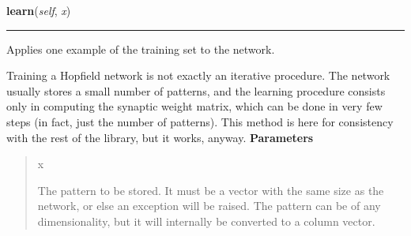 \hspace{.8\funcindent}\begin{boxedminipage}{\funcwidth}

    \raggedright \textbf{learn}(\textit{self}, \textit{x})

    \vspace{-1.5ex}

    \rule{\textwidth}{0.5\fboxrule}
\setlength{\parskip}{2ex}

Applies one example of the training set to the network.

Training a Hopfield network is not exactly an iterative procedure. The
network usually stores a small number of patterns, and the learning
procedure consists only in computing the synaptic weight matrix, which
can be done in very few steps (in fact, just the number of patterns).
This method is here for consistency with the rest of the library, but
it works, anyway.
\setlength{\parskip}{1ex}
      \textbf{Parameters}
      \vspace{-1ex}

      \begin{quote}
        \begin{Ventry}{x}

          \item[x]


The pattern to be stored. It must be a vector with the same size as
the network, or else an exception will be raised. The pattern can be
of any dimensionality, but it will internally be converted to a
column vector.
        \end{Ventry}

      \end{quote}

    \end{boxedminipage}

    \label{peach:nn:mem:Hopfield:train}

    \vspace{0.5ex}

